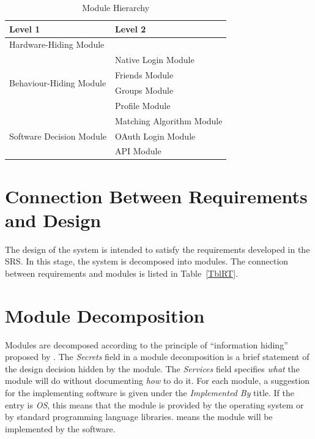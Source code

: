 \documentclass[12pt, titlepage]{article}
\begin{document}
\begin{table}[h!]
\centering
\begin{tabular}{p{} p{}}
\toprule
\textbf{Level 1} & \textbf{Level 2}\\
\midrule

{Hardware-Hiding Module} & ~ \\
\midrule

\multirow{4}{0.3\textwidth}{Behaviour-Hiding Module} & {Native Login Module}\\
& Friends Module\\
& Groups Module\\
& Profile Module\\
\midrule

\multirow{3}{0.3\textwidth}{Software Decision Module} & {Matching Algorithm Module}\\
& OAuth Login Module\\
& API Module\\
\bottomrule

\end{tabular}
\caption{Module Hierarchy}
\label{TblMH}
\end{table}

\section{Connection Between Requirements and Design} \label{SecConnection}

The design of the system is intended to satisfy the requirements developed in
the SRS. In this stage, the system is decomposed into modules. The connection
between requirements and modules is listed in Table~\ref{TblRT}.

\section{Module Decomposition} \label{SecMD}

Modules are decomposed according to the principle of ``information hiding''
proposed by \citet{ParnasEtAl1984}. The \emph{Secrets} field in a module
decomposition is a brief statement of the design decision hidden by the
module. The \emph{Services} field specifies \emph{what} the module will do
without documenting \emph{how} to do it. For each module, a suggestion for the
implementing software is given under the \emph{Implemented By} title. If the
entry is \emph{OS}, this means that the module is provided by the operating
system or by standard programming language libraries.  \emph{\progname{}} means the
module will be implemented by the \progname{} software.
\end{document}
